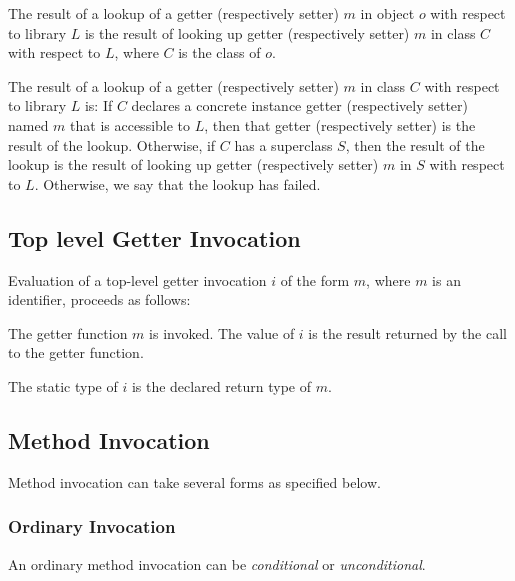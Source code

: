 \documentclass{article}
\begin{document}
\LMHash{}
The result of a lookup of a getter (respectively setter) $m$ in object $o$  with respect  to  library $L$ is the result of looking up getter (respectively setter) $m$ in class $C$ with respect to $L$, where $C$ is the class of $o$.

\LMHash{}
The result of a lookup of a getter (respectively setter) $m$ in class $C$  with respect to library $L$ is:
If $C$ declares a concrete instance getter (respectively setter) named $m$  that is accessible to $L$,  then that getter (respectively setter) is the result of the lookup. Otherwise, if $C$ has a superclass $S$, then the result of the lookup is the result of looking up getter (respectively setter) $m$ in $S$ with respect to $L$. Otherwise, we say that the lookup has failed.



\subsection{ Top level Getter Invocation}

\LMHash{}
Evaluation of a top-level getter invocation $i$ of the form $m$, where $m$ is an identifier, proceeds as follows:

\LMHash{}
The getter function $m$ is invoked. The value of $i$ is the result returned by the call to the getter function.

\LMHash{}
The static type of $i$ is the declared return type of $m$.

\subsection{ Method Invocation}

\LMHash{}
Method invocation can take several forms as specified below. 

\subsubsection{Ordinary Invocation}

\LMHash{}
An ordinary method invocation can be {\em conditional} or {\em unconditional}.
\end{document}
